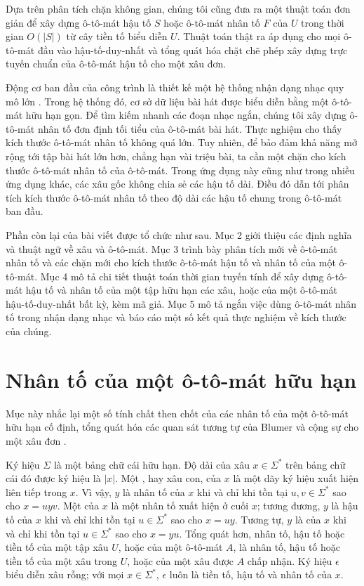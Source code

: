\documentclass[11pt]{article}
\newcommand{\eps}{\epsilon}
\begin{document}
Dựa trên phân tích chặn không gian, chúng tôi cũng đưa ra một thuật toán đơn
giản để xây dựng ô-tô-mát hậu tố $S$ hoặc ô-tô-mát nhân tố $F$ của $U$ trong
thời gian $O(|S|)$ từ cây tiền tố biểu diễn $U$. Thuật toán thật ra áp dụng cho
mọi ô-tô-mát đầu vào hậu-tố-duy-nhất và tổng quát hóa chặt chẽ phép xây dựng
trực tuyến chuẩn của ô-tô-mát hậu tố cho một xâu đơn.

Động cơ ban đầu của công trình là thiết kế một hệ thống nhận dạng nhạc quy mô
lớn \cite{weinstein-music,mohri-robust}. Trong hệ thống đó, cơ sở dữ liệu bài
hát được biểu diễn bằng một ô-tô-mát hữu hạn gọn. Để tìm kiếm nhanh các đoạn
nhạc ngắn, chúng tôi xây dựng ô-tô-mát nhân tố đơn định tối tiểu của ô-tô-mát
bài hát. Thực nghiệm cho thấy kích thước ô-tô-mát nhân tố không quá lớn. Tuy
nhiên, để bảo đảm khả năng mở rộng tới tập bài hát lớn hơn, chẳng hạn vài
triệu bài, ta cần một chặn cho kích thước ô-tô-mát nhân tố của ô-tô-mát. Trong
ứng dụng này cũng như trong nhiều ứng dụng khác, các xâu gốc không chia sẻ các
hậu tố dài. Điều đó dẫn tới phân tích kích thước ô-tô-mát nhân tố theo độ dài
các hậu tố chung trong ô-tô-mát ban đầu.

Phần còn lại của bài viết được tổ chức như sau. Mục 2 giới thiệu các định
nghĩa và thuật ngữ về xâu và ô-tô-mát. Mục 3 trình bày phân tích mới về
ô-tô-mát nhân tố và các chặn mới cho kích thước ô-tô-mát hậu tố và nhân tố của
một ô-tô-mát. Mục 4 mô tả chi tiết thuật toán thời gian tuyến tính để xây dựng
ô-tô-mát hậu tố và nhân tố của một tập hữu hạn các xâu, hoặc của một
ô-tô-mát hậu-tố-duy-nhất bất kỳ, kèm mã giả. Mục 5 mô tả ngắn việc dùng
ô-tô-mát nhân tố trong nhận dạng nhạc và báo cáo một số kết quả thực nghiệm
về kích thước của chúng.

\section{Nhân tố của một ô-tô-mát hữu hạn}

Mục này nhắc lại một số tính chất then chốt của các nhân tố của một ô-tô-mát
hữu hạn cố định, tổng quát hóa các quan sát tương tự của Blumer và cộng sự cho
một xâu đơn \cite{blumer-complete}.

Ký hiệu $\Sigma$ là một bảng chữ cái hữu hạn. Độ dài của xâu $x\in\Sigma^*$
trên bảng chữ cái đó được ký hiệu là $|x|$. Một , hay xâu con,
của $x$ là một dãy ký hiệu xuất hiện liên tiếp trong $x$. Vì vậy, $y$ là nhân
tố của $x$ khi và chỉ khi tồn tại $u,v\in\Sigma^*$ sao cho $x=uyv$. Một
 của $x$ là một nhân tố xuất hiện ở cuối $x$; tương đương, $y$ là
hậu tố của $x$ khi và chỉ khi tồn tại $u\in\Sigma^*$ sao cho $x=uy$. Tương tự,
$y$ là  của $x$ khi và chỉ khi tồn tại $u\in\Sigma^*$ sao cho
$x=yu$. Tổng quát hơn, nhân tố, hậu tố hoặc tiền tố của một tập xâu $U$, hoặc
của một ô-tô-mát $A$, là nhân tố, hậu tố hoặc tiền tố của một xâu trong $U$,
hoặc của một xâu được $A$ chấp nhận. Ký hiệu $\eps$ biểu diễn xâu rỗng; với
mọi $x\in\Sigma^*$, $\eps$ luôn là tiền tố, hậu tố và nhân tố của $x$.
\end{document}
